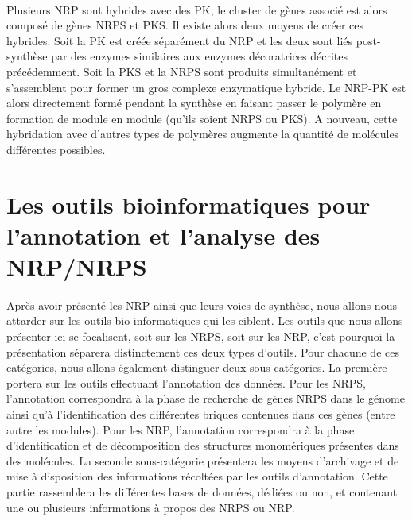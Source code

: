 \documentclass[12pt,french,twoside]{report}
\begin{document}
\paragraph{}Plusieurs NRP sont hybrides avec des PK, le cluster de gènes associé est alors composé de gènes NRPS et PKS.
Il existe alors deux moyens de créer ces hybrides.
Soit la PK est créée séparément du NRP et les deux sont liés post-synthèse par des enzymes similaires aux enzymes décoratrices décrites précédemment.
Soit la PKS et la NRPS sont produits simultanément et s'assemblent pour former un gros complexe enzymatique hybride.
Le NRP-PK est alors directement formé pendant la synthèse en faisant passer le polymère en formation de module en module (qu'ils soient NRPS ou PKS).
A nouveau, cette hybridation avec d'autres types de polymères augmente la quantité de molécules différentes possibles.









\section{Les outils bioinformatiques pour l'annotation et l'analyse des NRP/NRPS}

\paragraph{}Après avoir présenté les NRP ainsi que leurs voies de synthèse, nous allons nous attarder sur les outils bio-informatiques qui les ciblent.
Les outils que nous allons présenter ici se focalisent, soit sur les NRPS, soit sur les NRP, c'est pourquoi la présentation séparera distinctement ces deux types d'outils.
Pour chacune de ces catégories, nous allons également distinguer deux sous-catégories.
La première portera sur les outils effectuant l'annotation des données.
Pour les NRPS, l'annotation correspondra à la phase de recherche de gènes NRPS dans le génome ainsi qu'à l'identification des différentes briques contenues dans ces gènes (entre autre les modules).
Pour les NRP, l'annotation correspondra à la phase d'identification et de décomposition des structures monomériques présentes dans des molécules.
La seconde sous-catégorie présentera les moyens d'archivage et de mise à disposition des informations récoltées par les outils d'annotation.
Cette partie rassemblera les différentes bases de données, dédiées ou non, et contenant une ou plusieurs informations à propos des NRPS ou NRP.
\end{document}
